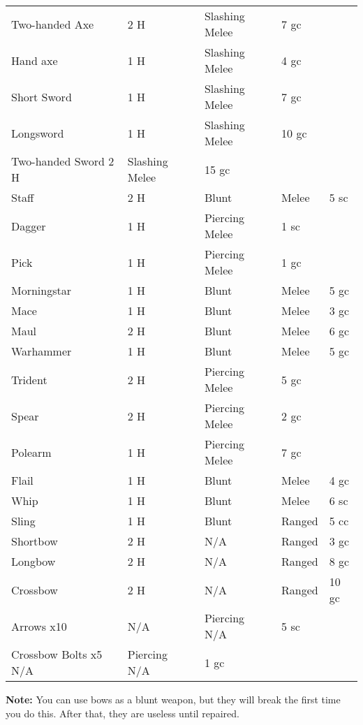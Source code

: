\begin{center}
{
\begin{xtabular}{|l|l|l|l|l|}
Two-handed Axe & 2 H & Slashing Melee & 7 gc \\
Hand axe & 1 H & Slashing Melee & 4 gc \\
Short Sword & 1 H & Slashing Melee & 7 gc \\
Longsword & 1 H & Slashing Melee & 10 gc \\
Two-handed Sword 2 H & Slashing Melee & 15 gc \\
Staff & 2 H & Blunt & Melee & 5 sc \\
Dagger & 1 H & Piercing Melee & 1 sc \\
Pick & 1 H & Piercing Melee & 1 gc \\
Morningstar & 1 H & Blunt & Melee & 5 gc \\
Mace & 1 H & Blunt & Melee & 3 gc \\
Maul & 2 H & Blunt & Melee & 6 gc \\
Warhammer & 1 H & Blunt & Melee & 5 gc \\
Trident & 2 H & Piercing Melee & 5 gc \\
Spear & 2 H & Piercing Melee & 2 gc \\
Polearm & 1 H & Piercing Melee & 7 gc \\
Flail & 1 H & Blunt & Melee & 4 gc \\
Whip & 1 H & Blunt & Melee & 6 sc \\
Sling & 1 H & Blunt & Ranged & 5 cc \\
Shortbow & 2 H & N/A & Ranged & 3 gc \\
Longbow & 2 H & N/A & Ranged & 8 gc \\
Crossbow & 2 H & N/A & Ranged & 10 gc \\
Arrows x10 & N/A & Piercing N/A & 5 sc \\
Crossbow Bolts x5 N/A & Piercing N/A & 1 gc \\
\hline
\end{xtabular}
}
\end{center}

\textbf{Note:} You can use bows as a blunt weapon, but they will break
the first time you do this. After that, they are useless until
repaired.

